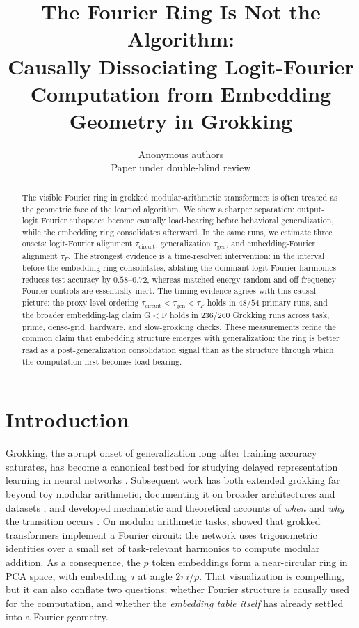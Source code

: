 \documentclass{article}
\title{The Fourier Ring Is Not the Algorithm:\\
Causally Dissociating Logit-Fourier Computation from Embedding Geometry in Grokking}
\author{Anonymous authors\\
        Paper under double-blind review}
\newcommand{\taug}{\tau_{\mathrm{gen}}}
\newcommand{\tauf}{\tau_{F}}
\newcommand{\taucirc}{\tau_{\mathrm{circuit}}}
\begin{document}
\maketitle

\begin{abstract}
The visible Fourier ring in grokked modular-arithmetic transformers
is often treated as the geometric face of the learned algorithm.
We show a sharper separation: output-logit Fourier subspaces become
causally load-bearing before behavioral generalization, while the
embedding ring consolidates afterward.
In the same runs, we estimate three onsets: logit-Fourier alignment
$\taucirc$, generalization $\taug$, and embedding-Fourier alignment
$\tauf$.
The strongest evidence is a time-resolved intervention: in the
interval before the embedding ring consolidates, ablating the
dominant logit-Fourier harmonics reduces test accuracy by
$0.58$--$0.72$, whereas matched-energy random and off-frequency
Fourier controls are essentially inert.
The timing evidence agrees with this causal picture: the proxy-level
ordering $\taucirc<\taug<\tauf$ holds in $48/54$ primary runs, and
the broader embedding-lag claim G$<$F holds in $236/260$ Grokking
runs across task, prime, dense-grid, hardware, and slow-grokking
checks.
These measurements refine the common claim that embedding structure
emerges with generalization: the ring is better read as a
post-generalization consolidation signal than as the structure
through which the computation first becomes load-bearing.
\end{abstract}

\section{Introduction}
\label{sec:intro}

Grokking, the abrupt onset of generalization long after training
accuracy saturates, has become a canonical testbed for studying
delayed representation learning in neural networks
\citep{power2022grokking}.
Subsequent work has both extended grokking far beyond toy modular
arithmetic, documenting it on broader architectures and datasets
\citep{liu2023omnigrok,humayun2024deep,miller2024grokking}, and
developed mechanistic and theoretical accounts of \emph{when} and
\emph{why} the transition occurs
\citep{nanda2023progress,varma2023explaining,lyu2024dichotomy,
       rubin2024grokking,kumar2024lazy,mohamadi2024grok}.
On modular arithmetic tasks, \citet{nanda2023progress} showed that
grokked transformers implement a Fourier circuit: the network uses
trigonometric identities over a small set of task-relevant harmonics
to compute modular addition.
As a consequence, the $p$ token embeddings form a near-circular ring
in PCA space, with embedding~$i$ at angle $2\pi i/p$.
That visualization is compelling, but it can also conflate two
questions: whether Fourier structure is causally used for the
computation, and whether the \emph{embedding table itself} has
already settled into a Fourier geometry.
\end{document}

